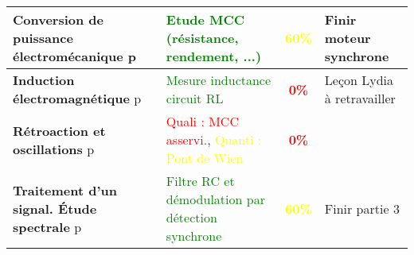 \begin{changemargin}{-1.5cm}{-0cm}
\begin{center}
\begin{tabularx}{\paperwidth-2cm}{| X | X | c | X |}
  \hline 
  \hline
  \textbf{Conversion de puissance électromécanique} p\pageref{LP_ConversionPuissance} & \textcolor{green}{Etude MCC (résistance, rendement, ...)} & \textcolor{yellow}{\textbf{60\%}} & Finir moteur synchrone\\
  \hline 
  \textbf{Induction électromagnétique} p\pageref{LP_Induction} & \textcolor{green}{Mesure inductance circuit RL} & \textcolor{red}{\textbf{0\%}} & Leçon Lydia à retravailler\\
  \hline
  \textbf{Rétroaction et oscillations} p\pageref{LP_RetroactionOscillation} & \textcolor{red}{Quali : MCC asservi.}, \textcolor{yellow}{Quanti : Pont de Wien} & \textcolor{red}{\textbf{0\%}} & \\
  \hline
  \textbf{Traitement d'un signal. Étude spectrale} p\pageref{LP_TraitementSignal} & \textcolor{green}{Filtre RC et démodulation par détection synchrone} & \textcolor{yellow}{\textbf{60\%}} & Finir partie 3\\
  \hline
\end{tabularx}
\end{center}


\end{changemargin}
